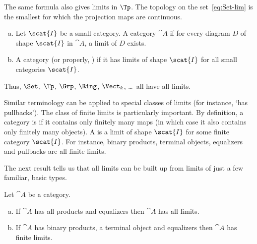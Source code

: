\begin{example}
The same formula also gives limits in $\Tp$.%
%
%
The topology on the set~\eqref{eq:Set-lim} is the smallest for which the
projection maps are continuous.
\end{example}

\begin{defn}    
\label{defn:has-lims}
\begin{enumerate}[(b)]
\item 
Let $\scat{I}$ be a small category.  A category $\cat{A}$  if for every diagram $D$ of shape $\scat{I}$ in
$\cat{A}$, a limit of $D$ exists.

\item 
A category  (or properly, )
if it has limits of shape $\scat{I}$ for all small categories $\scat{I}$.
\end{enumerate}
\end{defn}

Thus, $\Set$, $\Tp$, $\Grp$, $\Ring$, $\Vect_k$, \ldots\ all have all
limits. 

Similar terminology can be applied to special classes of limits (for
instance, `has pullbacks').  The class of finite limits is particularly
important.  By definition, a category is %
%
%
if it contains only finitely many maps (in which case it also contains only
finitely many objects).  A  is a limit of shape $\scat{I}$ for some finite category $\scat{I}$.
For instance, binary products, terminal objects, equalizers and pullbacks
are all finite limits.

The next result tells us that all limits can be built up from limits of
just a few familiar, basic types.

\begin{propn}	
\label{propn:lim-prod-eq}
%
%
Let $\cat{A}$ be a category.  
% 
\begin{enumerate}[(b)]
\item	
\label{propn:lim-prod-eq:all}
If $\cat{A}$ has all products and equalizers then $\cat{A}$ has all limits.

\item   
\label{propn:lim-prod-eq:fin}
If $\cat{A}$ has binary products, a terminal object and equalizers then
$\cat{A}$ has finite limits.
\end{enumerate}
\end{propn}

